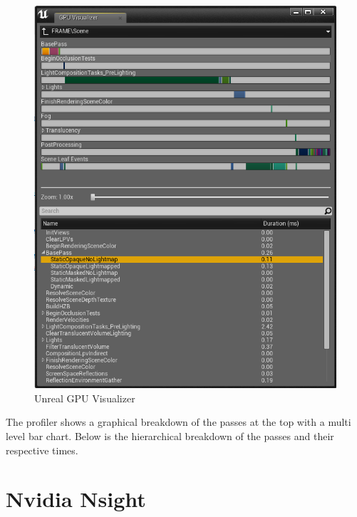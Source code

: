 \begin{figure}[htbp]
\includegraphics[scale = 0.45]{img/Unreal_GpuProfiler.PNG}
\caption{Unreal GPU Visualizer}
\label{fig:UnrealFPSChart}
\end{figure}

The profiler shows a graphical breakdown of the passes at the top with a multi level bar chart. Below is the hierarchical breakdown of the passes and their respective times. 

\section {Nvidia Nsight}

